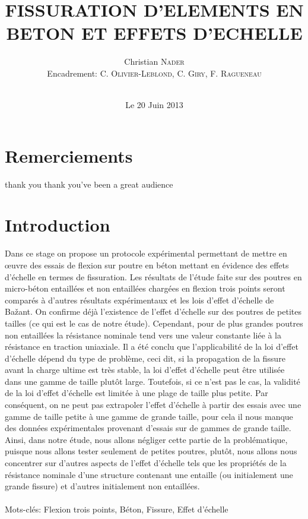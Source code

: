 \documentclass[12pt]{report}
\title{FISSURATION D'ELEMENTS EN BETON ET EFFETS D'ECHELLE}
\author{Christian \textsc{Nader}\\Encadrement: \textsc{C. Olivier-Leblond, C. Giry, F. Ragueneau}}
\date{\\Le 20 Juin 2013}
\begin{document}
  
\maketitle

\chapter*{Remerciements}
thank you thank you've been a great audience

\renewcommand{\contentsname}{Sommaire} 
\tableofcontents 
\listoffigures

\chapter*{Introduction}
Dans ce stage on propose un protocole expérimental permettant de mettre en œuvre des essais de
flexion sur poutre en béton mettant en évidence des effets d'échelle en termes de fissuration.
Les résultats de l'étude faite sur des poutres en micro-béton entaillées et non entaillées
chargées en flexion trois points seront comparés à d'autres résultats expérimentaux et les lois
d'effet d'échelle de Bažant. On confirme déjà l'existence de l'effet d'échelle sur des poutres de
petites tailles (ce qui est le cas de notre étude). Cependant, pour de plus grandes poutres non
entaillées la résistance nominale tend vers une valeur constante liée à la résistance en traction
uniaxiale. Il a été conclu que l'applicabilité de la loi d'effet d'échelle dépend du type de
problème, ceci dit, si la propagation de la fissure avant la charge ultime est très stable, la loi
d'effet d'échelle peut être utilisée dans une gamme de taille plutôt large. Toutefois, si ce n'est pas
le cas, la validité de la loi d'effet d'échelle est limitée à une plage de taille plus petite. Par
conséquent, on ne peut pas extrapoler l'effet d'échelle à partir des essais avec une gamme de
taille petite à une gamme de grande taille, pour cela il nous manque des données expérimentales
provenant d'essais sur de gammes de grande taille. Ainsi, dans notre étude, nous allons négliger
cette partie de la problématique, puisque nous allons tester seulement de petites poutres, plutôt,
nous allons nous concentrer sur d'autres aspects de l'effet d'échelle tels que les propriétés de la
résistance nominale d'une structure contenant une entaille (ou initialement une grande fissure) et
d'autres initialement non entaillées.\\\\
Mots-clés: Flexion trois points, Béton, Fissure, Effet d'échelle
\end{document}

